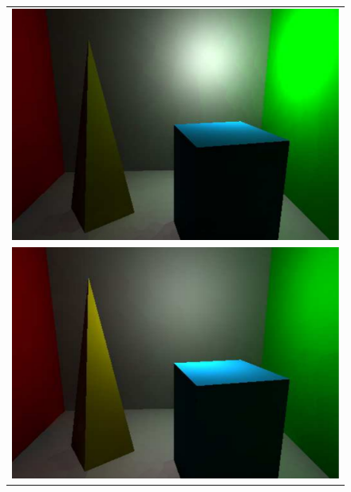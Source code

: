 \begin{figure}
\begin{center}
{\begin{tabular}{c}
\includegraphics*[scale=0.2]{imgs/pq2_frame9.pdf}\\
\includegraphics*[scale=0.2]{imgs/pq2_frame10.pdf}
\end{tabular}
}%
\end{center}
\end{figure}

